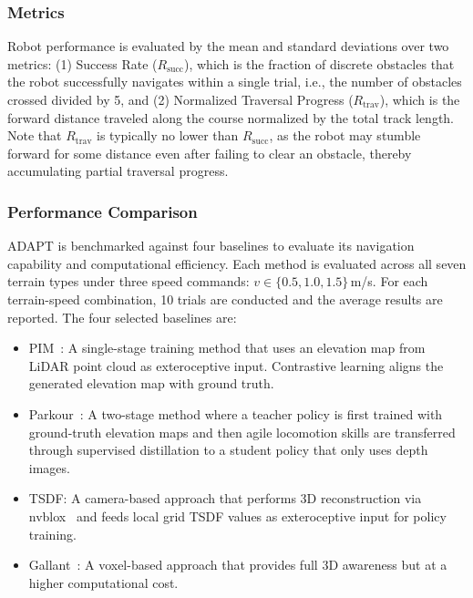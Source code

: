 \documentclass[letterpaper, 10 pt, conference]{ieeeconf/ieeeconf}
\begin{document}
\subsubsection{Metrics}
Robot performance is evaluated by the mean and standard deviations over two metrics:
(1) Success Rate ($R_{\mathrm{succ}}$), which is the fraction of discrete obstacles that the robot successfully navigates within a single trial, i.e., the number of obstacles crossed divided by 5, 
and (2) Normalized Traversal Progress ($R_{\mathrm{trav}}$), which is the forward distance traveled along the course normalized by the total track length. Note that $R_{\mathrm{trav}}$ is typically no lower than $R_{\mathrm{succ}}$, as the robot may stumble forward for some distance even after failing to clear an obstacle, thereby accumulating partial traversal progress.

\subsubsection{Performance Comparison}
ADAPT is benchmarked against four baselines to evaluate its navigation capability and computational efficiency.
Each method is evaluated across all seven terrain types under three speed commands: $v \in \{0.5, 1.0, 1.5\}$\,m/s.
For each terrain-speed combination, 10 trials are conducted and the average results are reported.
The four selected baselines are:
\begin{itemize}
    \item PIM~\cite{long2025learning}: A single-stage training method that uses an elevation map from LiDAR point cloud as exteroceptive input. Contrastive learning aligns the generated elevation map with ground truth.
    \item Parkour~\cite{zhuang2024humanoid}: A two-stage method where a teacher policy is first trained with ground-truth elevation maps and then agile locomotion skills are transferred through supervised distillation to a student policy that only uses depth images.
    \item TSDF: A camera-based approach that performs 3D reconstruction via nvblox~\cite{nvblox_2023_GPUAcceleratedSDFMapping} and feeds local grid TSDF values as exteroceptive input for policy training.
    \item Gallant~\cite{Ben_2025_Gallant}: A voxel-based approach that provides full 3D awareness but at a higher computational cost.
\end{itemize}
\end{document}
